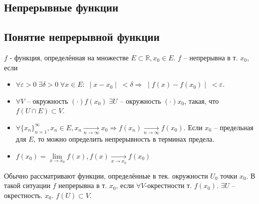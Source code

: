\begin{center}
	\section{\LARGE{\bf Непрерывные функции}}
\end{center}
\subsection{Понятие непрерывной функции}
\begin{Definition}
	$f$ - функция, определённая на множестве $E \subset \mathbb{R}, x_0 \in E$. $f$ -- непрерывна в т. $x_0$, если
	\begin{itemize}
		\item $\displaystyle \forall \varepsilon > 0 \; \exists \delta > 0\; \forall x \in E: \; \mid x - x_0 \mid \; < \delta \Rightarrow \; \mid f(x) - f(x_0) \mid \; < \varepsilon$.
		\item $\displaystyle \forall V$ -- окружность $(\cdot) f(x_0) \; \exists U$ -- окружность $(\cdot) x_0$, такая, что $f(U \cap E) \subset V$.
		\item $\displaystyle \forall \{x_n\}_{n=1}^{\infty}, x_n \in E, x_n \xrightarrow[n \rightarrow \infty]{} x_0 \Rightarrow f(x_n) \xrightarrow[n \rightarrow \infty]{} f(x_0)$.
		      Если $x_0$ -- предельная для $E$, то можно определить непрерывность в терминах предела.
		\item $f(x_0) = \lim\limits_{x \rightarrow x_0}f(x), f(x) \xrightarrow[x \rightarrow x_0]{} f(x_0)$
	\end{itemize}
\end{Definition}
Обычно рассматривают функции, определённые в тек. окружности $U_0$ точки $x_0$.
В такой ситуации $f$ непрерывна в т. $x_0$, если $\forall V$-окрестности т. $f(x_0)$. $\exists U$ -- окрестность. $x_0$. $f(U) \subset V$.

